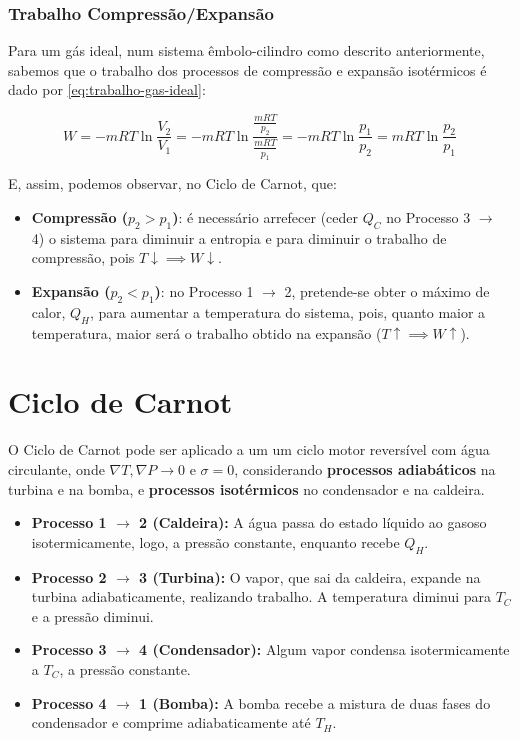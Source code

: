 \subsubsection{Trabalho Compressão/Expansão}

Para um gás ideal, num sistema êmbolo-cilindro como descrito anteriormente, sabemos que o trabalho dos processos de compressão e expansão isotérmicos é dado por \ref{eq:trabalho-gas-ideal}:

\begin{equation}
    W = - mRT \ln \frac{V_2}{V_1} = - mRT \ln \frac{\frac{mR T}{p_2}}{\frac{mR T}{p_1}} = - mRT \ln \frac{p_1}{p_2} = mRT \ln \frac{p_2}{p_1}
\end{equation}

E, assim, podemos observar, no Ciclo de Carnot, que:

\begin{itemize}
    \item \textbf{Compressão ($p_2 > p_1$)}: é necessário arrefecer (ceder $Q_C$ no Processo 3 $\rightarrow$ 4) o sistema para diminuir a entropia e para diminuir o trabalho de compressão, pois $T \downarrow \implies W \downarrow$.
    \item \textbf{Expansão ($p_2 < p_1$)}: no Processo 1 $\rightarrow$ 2, pretende-se obter o máximo de calor, $Q_H$, para aumentar a temperatura do sistema, pois, quanto maior a temperatura, maior será o trabalho obtido na expansão ($T \uparrow \implies W \uparrow$).
\end{itemize}



\section{Ciclo de Carnot}

O Ciclo de Carnot pode ser aplicado a um um ciclo motor reversível com água circulante, onde $\nabla T, \nabla P \to 0$ e $\sigma = 0$, considerando \textbf{processos adiabáticos} na turbina e na bomba, e \textbf{processos isotérmicos} no condensador e na caldeira.

\begin{itemize}
    \item \textbf{Processo 1 $\rightarrow$ 2 (Caldeira):} A água passa do estado líquido ao gasoso isotermicamente, logo, a pressão constante, enquanto recebe $Q_H$.
    \item \textbf{Processo 2 $\rightarrow$ 3 (Turbina):} O vapor, que sai da caldeira, expande na turbina adiabaticamente, realizando trabalho. A temperatura diminui para $T_C$ e a pressão diminui.
    \item \textbf{Processo 3 $\rightarrow$ 4 (Condensador):} Algum vapor condensa isotermicamente a $T_C$, a pressão constante.
    \item \textbf{Processo 4 $\rightarrow$ 1 (Bomba):} A bomba recebe a mistura de duas fases do condensador e comprime adiabaticamente até $T_H$. 
\end{itemize}

